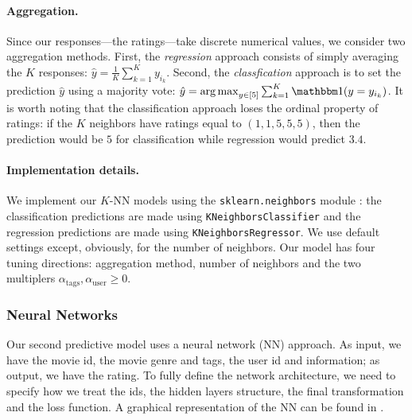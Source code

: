 \documentclass[bj, preprint]{imsart}
\begin{document}
\paragraph{Aggregation.}\label{par:method.models.knn.agg}

Since our responses---the ratings---take discrete numerical values, we consider two aggregation methods. First, the \textit{regression} approach consists of simply averaging the $K$ responses: $\hat{y} = \frac 1K \sum_{k=1}^{K} y_{i_k}$. Second, the \textit{classfication} approach is to set the prediction $\hat{y}$ using a majority vote: $\hat{y} = \argmax_{y\in[5]}\sum_{k=1}^{K} \ind(y=y_{i_k})$. It is worth noting that the classification approach loses the ordinal property of ratings: if the $K$ neighbors have ratings equal to $(1,1,5,5,5)$, then the prediction would be $5$ for classification while regression would predict $3.4$.

\paragraph{Implementation details.}\label{par:method.models.knn.impl}

We implement our $K$-NN models using the \texttt{sklearn.neighbors} module \citep{scikit-learn}: the classification predictions are made using \texttt{KNeighborsClassifier} and the regression predictions are made using \texttt{KNeighborsRegressor}. We use default settings except, obviously, for the number of neighbors. Our model has four tuning directions: aggregation method, number of neighbors and the two multiplers $\alpha_\text{tags},\alpha_\text{user}\geqslant 0$.

\subsubsection{Neural Networks}\label{subsubsec:method.models.nn}

Our second predictive model uses a neural network (NN) approach. As input, we have the movie id, the movie genre and tags, the user id and information; as output, we have the rating. 
To fully define the network architecture, we need to specify how we treat the ids, the hidden layers structure, the final transformation and the loss function. 
A graphical representation of the NN can be found in .
\end{document}
